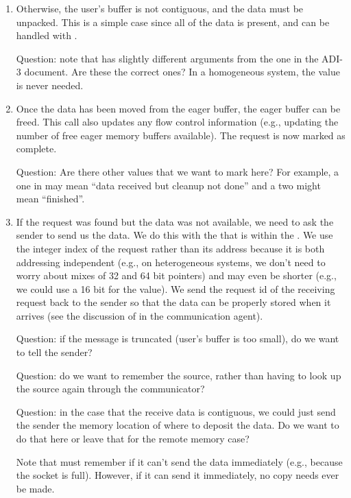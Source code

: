\begin{enumerate}
\item Otherwise, the user's buffer is not contiguous, and the data must be
  unpacked.  This is a simple case since all of the data is present, and 
  can be handled with .

  Question: note that  has slightly different arguments
  from the one in the ADI-3 document.  Are these the correct ones?  In a
  homogeneous system, the  value is never needed.

\item Once the data has been moved from the eager buffer, the eager buffer 
 can be freed.  This call also updates any flow control information (e.g.,
 updating the number of free eager memory buffers available).  The request is
 now marked as complete.

  Question: Are there other values that we want to mark here?  For example, 
  a one in  may mean ``data received but cleanup not done'' and
  a two might mean ``finished''.

\item If the request was found but the data was not available, we need to ask
  the sender to send us the data.  We do this with the  that is
  within the .  We use the integer index of the
  request rather than its address because it is both addressing independent
  (e.g., on heterogeneous systems, we don't need to worry about mixes of 32
  and 64 bit pointers) and may even be shorter (e.g., we could use a 16 bit
   for the value).  We send the request id of the receiving
  request back to the sender so that the data can be properly stored when it
  arrives (see the discussion of  in the
  communication agent).

  Question: if the message is truncated (user's buffer is too small), do 
  we want to tell the sender?

  Question: do we want to remember the source, rather than having to look up
  the source again through the communicator?

  Question: in the case that the receive data is contiguous, we could just
  send the sender the memory location of where to deposit the data.  Do we
  want to do that here or leave that for the remote memory case?

  Note that  must remember  if it can't send
  the data immediately (e.g., because the socket is full).  However, if it can
  send it immediately, no copy needs ever be made.


\end{enumerate}
